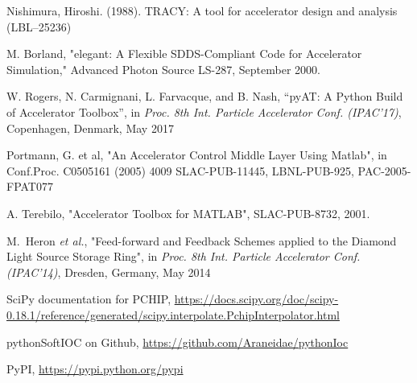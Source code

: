 \documentclass[a4paper,
               keeplastbox,   %
               ]{jacow}
\begin{document}
\begin{thebibliography}{9}                                                      
                  
    Nishimura, Hiroshi. (1988). TRACY: A tool for accelerator design and analysis (LBL--25236)

    M. Borland, "elegant: A Flexible SDDS-Compliant Code for Accelerator Simulation," Advanced Photon Source LS-287, September 2000.
      
    W. Rogers, N. Carmignani, L. Farvacque, and B. Nash,
    \textquotedblleft{pyAT: A Python Build of Accelerator Toolbox}\textquotedblright,
    in \emph{Proc. 8th Int. Particle Accelerator Conf. (IPAC'17)}, 
    Copenhagen, Denmark, May 2017

     Portmann, G. et al, "An Accelerator Control Middle Layer Using Matlab", 
     in Conf.Proc. C0505161 (2005) 4009 SLAC-PUB-11445, LBNL-PUB-925, PAC-2005-FPAT077 
     
    A. Terebilo, "Accelerator Toolbox for MATLAB", SLAC-PUB-8732, 2001.   
    
  M.~Heron {\it et al.},
  "Feed-forward and Feedback Schemes applied to the Diamond Light Source Storage Ring",
      in \emph{Proc. 8th Int. Particle Accelerator Conf. (IPAC'14)}, 
    Dresden, Germany, May 2014
    
 SciPy documentation for PCHIP, \url{https://docs.scipy.org/doc/scipy-0.18.1/reference/generated/scipy.interpolate.PchipInterpolator.html}

    pythonSoftIOC on Github, \url{https://github.com/Araneidae/pythonIoc} 
    
    PyPI, \url{https://pypi.python.org/pypi} 
                                                  
\end{thebibliography}                                                 
\end{document}
